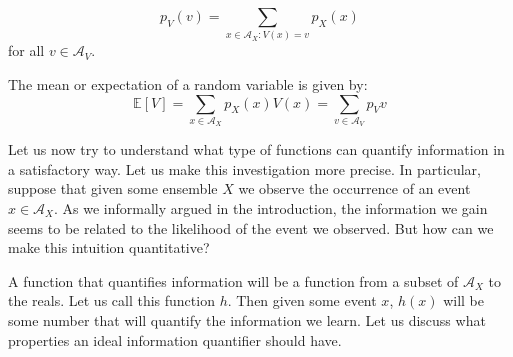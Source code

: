\begin{equation}
p_V(v)=\sum_{x\in\mathcal A_X:V(x)=v}p_X(x)
\end{equation} 
for all $v\in\mathcal A_V$.

The mean or expectation of a random variable is given by:
\begin{equation}
\mathbb E[V]=\sum_{x\in\mathcal A_X}p_X(x)V(x)=\sum_{v\in\mathcal A_V}p_Vv
\end{equation}

\label{sec:axent}
Let us now try to understand what type of functions can quantify information in a satisfactory way. Let us make this investigation more precise. In particular, suppose that given some ensemble $X$ we observe the occurrence of an event $x\in\mathcal A_X$. As we informally argued in the introduction, the information we gain seems to be related to the likelihood of the event we observed. But how can we make this intuition quantitative? %

A function that quantifies information will be a function from a subset of $\mathcal A_X$ to the reals. 
Let us call this function $h$. 
Then given some event $x$, $h(x)$ will be some number that will quantify the information we learn. 
Let us discuss what properties an ideal information quantifier should have. 

